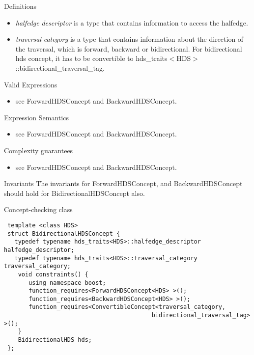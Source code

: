\begin{Desc}
\item[Definitions]\begin{itemize}
\item {\em halfedge\/} {\em descriptor\/} is a type that contains information to access the halfedge.\item {\em traversal\/} {\em category\/} is a type that contains information about the direction of the traversal, which is forward, backward or bidirectional. For bidirectional hds concept, it has to be convertible to hds\_\-traits$<$HDS$>$::bidirectional\_\-traversal\_\-tag.\end{itemize}
\end{Desc}
\begin{Desc}
\item[Valid Expressions]\begin{itemize}
\item see Forward\-HDSConcept and Backward\-HDSConcept.\end{itemize}
\end{Desc}
\begin{Desc}
\item[Expression Semantics]\begin{itemize}
\item see Forward\-HDSConcept and Backward\-HDSConcept.\end{itemize}
\end{Desc}
\begin{Desc}
\item[Complexity guarantees]\begin{itemize}
\item see Forward\-HDSConcept and Backward\-HDSConcept.\end{itemize}
\end{Desc}
\begin{Desc}
\item[Invariants ]The invariants for Forward\-HDSConcept, and Backward\-HDSConcept should hold for Bidirectional\-HDSConcept also.\end{Desc}
\begin{Desc}
\item[Concept-checking class]

\begin{Code}\begin{verbatim} template <class HDS> 
 struct BidirectionalHDSConcept {
   typedef typename hds_traits<HDS>::halfedge_descriptor halfedge_descriptor; 
   typedef typename hds_traits<HDS>::traversal_category traversal_category;
    void constraints() {
       using namespace boost;
       function_requires<ForwardHDSConcept<HDS> >();
       function_requires<BackwardHDSConcept<HDS> >();
       function_requires<ConvertibleConcept<traversal_category,
                                          bidirectional_traversal_tag> >();  
    }
    BidirectionalHDS hds;
 };
\end{verbatim}\end{Code}

 \end{Desc}
